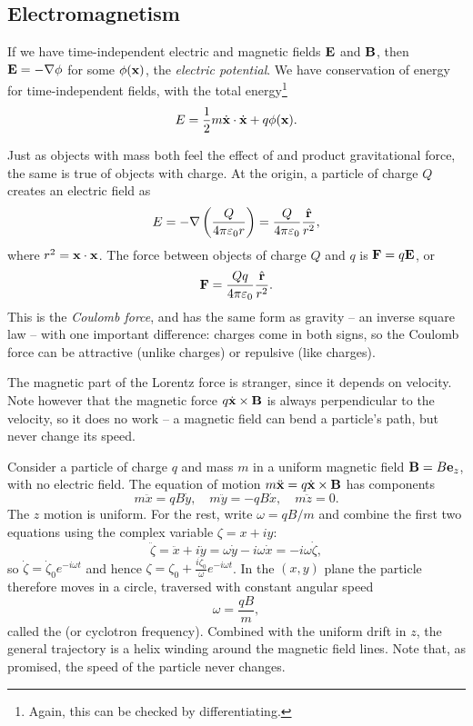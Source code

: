 \documentclass[a4paper]{scrartcl}
\newcommand{\hh}[1]{\hat{\vv{#1}}}
\begin{document}
\subsection{Electromagnetism}

If we have time-independent electric and magnetic fields $\mathbf{E}$ and $\mathbf{B}$, then $\mathbf{E} = - \nabla \phi$ for some $\phi(\mathbf{x})$, the \emph{electric potential}. We have conservation of energy for time-independent fields, with the total energy\footnote{Again, this can be checked by differentiating.}
$$
E = \frac{1}{2}m \dot{\mathbf{x}} \cdot \dot{\mathbf{x}} + q \phi(\mathbf{x}). 
$$

Just as objects with mass both feel the effect of and product gravitational force, the same is true of objects with charge. At the origin, a particle of charge $Q$ creates an electric field as
$$
E = - \nabla \left(\frac{Q}{4 \pi \varepsilon_0 r}\right) = \frac{Q}{4 \pi \varepsilon_0} \frac{\hh r}{r^2},
$$
where $r^2 = \mathbf{x} \cdot \mathbf{x}$. The force between objects of charge $Q$ and $q$ is $\mathbf{F} = q \mathbf{E}$, or
$$
\vv F = \frac{Qq}{4 \pi \varepsilon_0} \frac{\hh r}{r^2}.
$$
This is the \emph{Coulomb force}, and has the same form as gravity -- an inverse square law -- with one important difference: charges come in both signs, so the Coulomb force can be attractive (unlike charges) or repulsive (like charges).

The magnetic part of the Lorentz force is stranger, since it depends on velocity. Note however that the magnetic force $q\dot{\mathbf{x}} \times \mathbf{B}$ is always perpendicular to the velocity, so it does no work -- a magnetic field can bend a particle's path, but never change its speed.

\begin{example}
	Consider a particle of charge $q$ and mass $m$ in a uniform magnetic field $\mathbf{B} = B \mathbf{e}_z$, with no electric field. The equation of motion $m\ddot{\mathbf{x}} = q \dot{\mathbf{x}} \times \mathbf{B}$ has components
	$$
	m \ddot{x} = q B\dot{y} , \quad m \ddot{y} = -qB \dot{x}, \quad m \ddot{z} = 0.
	$$
	The $z$ motion is uniform. For the rest, write $\omega = qB/m$ and combine the first two equations using the complex variable $\zeta = x + iy$:
	$$
	\ddot{\zeta} = \ddot x + i \ddot y = \omega \dot y - i \omega \dot x = -i\omega \dot{\zeta},
	$$
	so $\dot{\zeta} = \dot\zeta_0 e^{-i\omega t}$ and hence $\zeta = \zeta_0 + \frac{i\dot\zeta_0}{\omega}e^{-i \omega t}$. In the $(x, y)$ plane the particle therefore moves in a circle, traversed with constant angular speed
	$$
	\omega = \frac{qB}{m},
	$$
	called the  (or cyclotron frequency). Combined with the uniform drift in $z$, the general trajectory is a helix winding around the magnetic field lines. Note that, as promised, the speed of the particle never changes.
\end{example}
\end{document}
